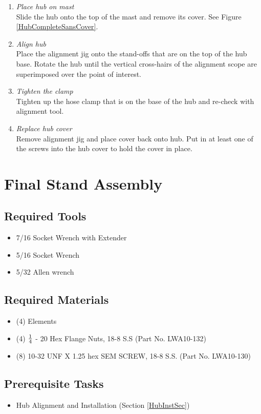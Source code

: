\documentclass[12pt]{article}
\begin{document}
\begin{enumerate}
\begin{enumerate}
			\item \emph{Place hub on mast} \\ Slide the hub onto the top of the mast and remove its cover. See Figure \ref{HubCompleteSansCover}.
			\item \emph{Align hub} \\ Place the alignment jig onto the stand-offs that are on the top of the hub base. Rotate the hub until the vertical cross-hairs of the alignment scope are superimposed over the point of interest.
			\item \emph{Tighten the clamp} \\ Tighten up the hose clamp that is on the base of the hub and re-check with alignment tool.
			\item \emph{Replace hub cover} \\ Remove alignment jig and place cover back onto hub. Put in at least one of the screws into the hub cover to hold the cover in place. 
			
	\end{enumerate}

\section{Final Stand Assembly}
	\subsection{Required Tools}
		\begin{itemize}
			\item 7/16 Socket Wrench with Extender
			\item 5/16 Socket Wrench
			\item 5/32 Allen wrench
		\end{itemize}
	\subsection{Required Materials}
		\begin{itemize}
			\item (4) Elements
			\item (4) $1 \over 4$ - 20 Hex Flange Nuts, 18-8 S.S (Part No. LWA10-132)
			\item (8) 10-32 UNF X 1.25 hex SEM SCREW, 18-8 S.S. (Part No. LWA10-130)
		\end{itemize}
	\subsection{Prerequisite Tasks}
		\begin{itemize}
			\item Hub Alignment and Installation (Section \ref{HubInstSec})
		\end{itemize}

\end{enumerate}
\end{document}
